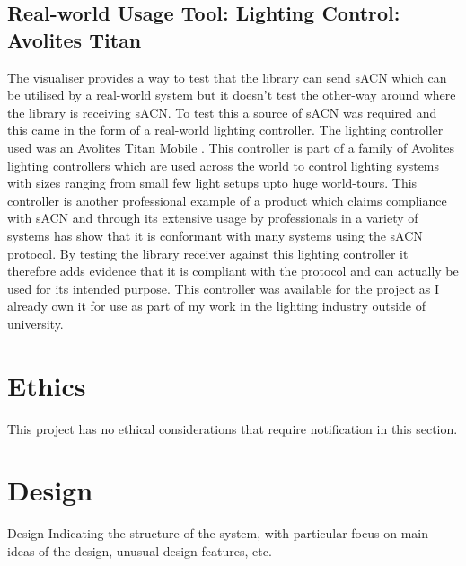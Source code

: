\documentclass[11pt,a4paper]{article}
\begin{document}
\subsection{Real-world Usage Tool: Lighting Control: Avolites Titan}
The visualiser provides a way to test that the library can send sACN which can be utilised by a real-world system but it doesn't test the other-way around where the library is receiving sACN. To test this a source of sACN was required and this came in the form of a real-world lighting controller. The lighting controller used was an Avolites Titan Mobile \cite{AVO_TITAN_MOBILE}. This controller is part of a family of Avolites lighting controllers which are used across the world to control lighting systems with sizes ranging from small few light setups upto huge world-tours. This controller is another professional example of a product which claims compliance with sACN and through its extensive usage by professionals in a variety of systems has show that it is conformant with many systems using the sACN protocol. By testing the library receiver against this lighting controller it therefore adds evidence that it is compliant with the protocol and can actually be used for its intended purpose. This controller was available for the project as I already own it for use as part of my work in the lighting industry outside of university. 

\section{Ethics}
This project has no ethical considerations that require notification in this section.

\section{Design}
Design
Indicating the structure of the system, with particular
focus on main ideas of the design, unusual design
features, etc.
\end{document}
